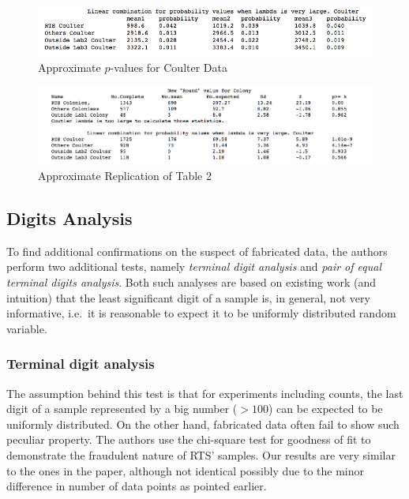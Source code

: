 \documentclass{article}
\begin{document}
\begin{figure}[H]
\centering
\includegraphics[width=0.9\linewidth]{images/Lambda_Coulter.png}
\caption{Approximate $p$-values for Coulter Data}
\end{figure}

\begin{figure}[H]
\centering
\includegraphics[width=0.9\linewidth]{images/HT_Stat_values.png}
\caption{Approximate Replication of Table 2}
\end{figure}

    \subsection{Digits Analysis}\label{digits-analysis}

To find additional confirmations on the suspect of fabricated data, the
authors perform two additional tests, namely \textit{terminal
digit analysis} and \textit{pair of equal terminal digits analysis}. Both
such analyses are based on existing work (and intuition) that the least significant digit of a sample is, in general, not very informative, i.e.~it is reasonable to expect it to be uniformly distributed random variable.



\subsubsection{Terminal digit analysis}\label{terminal-digit-analysis}

The assumption behind this test is that for experiments including
counts, the last digit of a sample represented by a big number
($>100$) can be expected to be uniformly distributed. On the
other hand, fabricated data often fail to show such peculiar property.
The authors use the chi-square test for goodness of fit to demonstrate
the fraudulent nature of RTS' samples. Our results are very similar to
the ones in the paper, although not identical possibly due to the minor difference in number of data points as pointed earlier.
\end{document}
